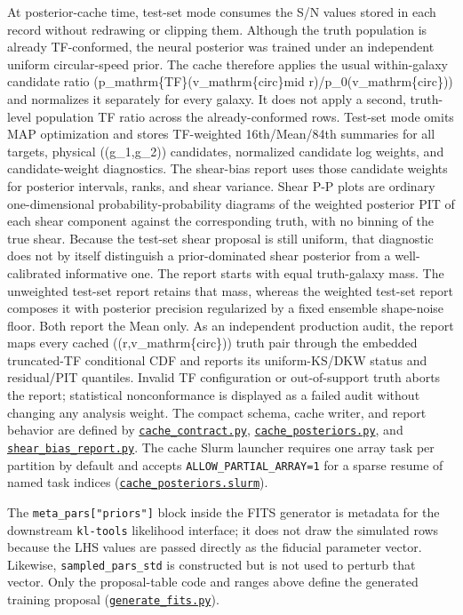 \documentclass[11pt]{article}
\newcommand{\code}[1]{\nolinkurl{#1}}
\begin{document}
At posterior-cache time, test-set mode consumes the S/N values stored in each
record without redrawing or clipping them. Although the truth population is
already TF-conformed, the neural posterior was trained under an independent
uniform circular-speed prior. The cache therefore applies the usual
within-galaxy candidate ratio
(p\_mathrm\{TF\}(v\_mathrm\{circ\}mid r)/p\_0(v\_mathrm\{circ\})) and normalizes it
separately for every galaxy. It does not apply a second, truth-level population
TF ratio across the already-conformed rows. Test-set mode omits MAP
optimization and stores TF-weighted 16th/Mean/84th summaries for all targets,
physical ((g\_1,g\_2)) candidates, normalized candidate log weights, and
candidate-weight diagnostics. The shear-bias report uses those candidate
weights for posterior intervals, ranks, and shear variance. Shear P-P plots are
ordinary one-dimensional probability-probability diagrams of the weighted
posterior PIT of each shear component against the corresponding truth, with no
binning of the true shear. Because the test-set shear proposal is still
uniform, that diagnostic does not by itself distinguish a prior-dominated shear
posterior from a well-calibrated informative one. The report starts with
equal truth-galaxy mass. The unweighted test-set report retains that mass,
whereas the weighted test-set report composes it with posterior precision
regularized by a fixed ensemble shape-noise floor. Both report the Mean only.
As an independent production audit, the report maps every cached
((r,v\_mathrm\{circ\})) truth pair through the embedded truncated-TF
conditional CDF and reports its uniform-KS/DKW status and residual/PIT
quantiles. Invalid TF configuration or out-of-support truth aborts the report;
statistical nonconformance is displayed as a failed audit without changing any
analysis weight. The compact schema, cache writer, and report behavior are defined by
\href{../arch/cache_contract.py}{\code{cache_contract.py}},
\href{../arch/cache_posteriors.py}{\code{cache_posteriors.py}}, and
\href{../arch/diagnostics/shear_bias_report.py}{\code{shear_bias_report.py}}. The cache
Slurm launcher requires one array task per partition by default and accepts
\code{ALLOW_PARTIAL_ARRAY=1} for a sparse resume of named task indices
(\href{../arch/cache_posteriors.slurm}{\code{cache_posteriors.slurm}}).

The \code{meta_pars["priors"]} block inside the FITS generator is metadata for
the downstream \code{kl-tools} likelihood interface; it does not draw the simulated
rows because the LHS values are passed directly as the fiducial parameter
vector. Likewise, \code{sampled_pars_std} is constructed but is not used to perturb
that vector. Only the proposal-table code and ranges above define the generated
training proposal (\href{../data_generate/generate_fits.py}{\code{generate_fits.py}}).
\end{document}
